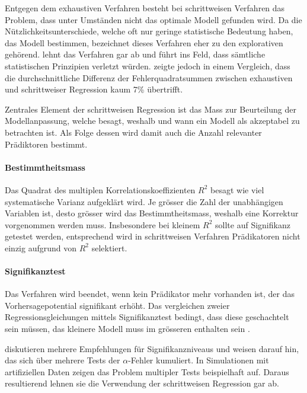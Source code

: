 \documentclass[english,12pt,doc]{apa}
\begin{document}
Entgegen dem exhaustiven Verfahren besteht bei schrittweisen Verfahren das Problem, dass unter Umständen nicht das optimale Modell gefunden wird. 
Da die Nützlichkeitsunterschiede, welche oft nur geringe statistische Bedeutung haben, das Modell bestimmen, bezeichnet  dieses Verfahren eher zu den explorativen gehörend. 
 lehnt das Verfahren gar ab und führt ins Feld, dass sämtliche statistischen Prinzipien verletzt würden. 
 zeigte jedoch in einem Vergleich, dass die durchschnittliche Differenz der Fehlerquadratsummen zwischen exhaustiven und schrittweiser Regression kaum 7\% übertrifft. 

Zentrales Element der schrittweisen Regression ist das Mass zur Beurteilung der  Modellanpassung, welche besagt, weshalb und wann ein Modell als akzeptabel zu betrachten ist. 
Als Folge dessen wird damit auch die Anzahl relevanter Prädiktoren bestimmt.

\paragraph{Bestimmtheitsmass}  Das Quadrat des multiplen Korrelationskoeffizienten $R^2$ besagt wie viel systematische Varianz aufgeklärt wird. 
Je grösser die Zahl der unabhängigen Variablen ist, desto grösser wird das Bestimmtheitsmass, weshalb eine Korrektur vorgenommen werden muss. 
Insbesondere bei kleinem $R^2$ sollte auf Signifikanz getestet werden, entsprechend wird in schrittweisen Verfahren Prädikatoren nicht einzig aufgrund von $R^2$ selektiert. 

\paragraph{Signifikanztest} Das Verfahren wird beendet, wenn kein Prädikator mehr vorhanden ist, der das Vorhersagepotential signifikant erhöht. 
Das vergleichen zweier Regressionsgleichungen mittels Signifikanztest bedingt, dass diese geschachtelt sein müssen, das kleinere Modell muss im grösseren enthalten sein \cite[p. 508]{jacob2003applied}.

 diskutieren mehrere Empfehlungen für Signifikanzniveaus und weisen darauf hin, das sich über mehrere Tests der $\alpha$-Fehler kumuliert. 
In  Simulationen mit artifiziellen Daten zeigen  das  Problem multipler Tests beispielhaft auf. 
Daraus resultierend lehnen sie die Verwendung der schrittweisen Regression gar ab.
 
\end{document}
